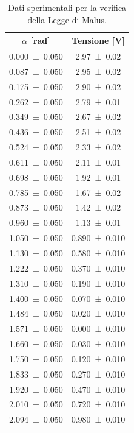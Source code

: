 \documentclass[a4paper]{article}
\begin{document}
\begin{table}[htbp]
\centering
\caption{Dati sperimentali per la verifica della Legge di Malus.}
\label{tab:dati_Malus}
\begin{tabular}{|c|c|}
\hline
$\alpha$ [\si{\radian}] & Tensione [\si{\volt}] \\\hline\hline
\num{0.000 \pm 0.050} & \num{2.97 \pm 0.02} \\
\num{0.087 \pm 0.050} & \num{2.95 \pm 0.02} \\
\num{0.175 \pm 0.050} & \num{2.90 \pm 0.02} \\
\num{0.262 \pm 0.050} & \num{2.79 \pm 0.01} \\
\num{0.349 \pm 0.050} & \num{2.67 \pm 0.02} \\
\num{0.436 \pm 0.050} & \num{2.51 \pm 0.02} \\
\num{0.524 \pm 0.050} & \num{2.33 \pm 0.02} \\
\num{0.611 \pm 0.050} & \num{2.11 \pm 0.01} \\
\num{0.698 \pm 0.050} & \num{1.92 \pm 0.01} \\
\num{0.785 \pm 0.050} & \num{1.67 \pm 0.02} \\
\num{0.873 \pm 0.050} & \num{1.42 \pm 0.02} \\
\num{0.960 \pm 0.050} & \num{1.13 \pm 0.01} \\
\num{1.050 \pm 0.050} & \num{0.890 \pm 0.010} \\ %
\num{1.130 \pm 0.050} & \num{0.580 \pm 0.010} \\ %
\num{1.222 \pm 0.050} & \num{0.370 \pm 0.010} \\ %
\num{1.310 \pm 0.050} & \num{0.190 \pm 0.010} \\ %
\num{1.400 \pm 0.050} & \num{0.070 \pm 0.010} \\ %
\num{1.484 \pm 0.050} & \num{0.020 \pm 0.010} \\ %
\num{1.571 \pm 0.050} & \num{0.000 \pm 0.010} \\ %
\num{1.660 \pm 0.050} & \num{0.030 \pm 0.010} \\ %
\num{1.750 \pm 0.050} & \num{0.120 \pm 0.010} \\ %
\num{1.833 \pm 0.050} & \num{0.270 \pm 0.010} \\ %
\num{1.920 \pm 0.050} & \num{0.470 \pm 0.010} \\ %
\num{2.010 \pm 0.050} & \num{0.720 \pm 0.010} \\ %
\num{2.094 \pm 0.050} & \num{0.980 \pm 0.010} \\ %

\end{tabular}
\end{table}
\end{document}
